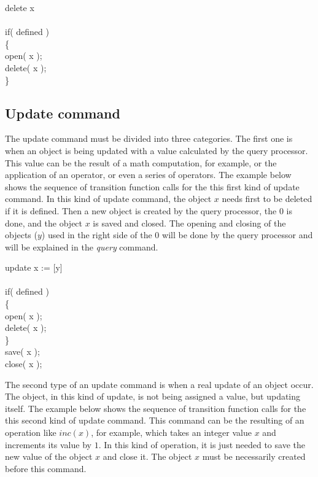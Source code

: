 \documentclass [11pt, a4paper] {article}
\begin{document}
\begin{table}[h]
\begin{pseudocode}
delete x \\
\\
if( defined ) \\
\{ \\
\> open( x ); \\
\> delete( x ); \\
\}
\end{pseudocode}
\end{table}

\subsection{Update command}

The update command must be divided into three categories. The first one is when an object is being updated with a value calculated by the query processor. This value can be the result of a math computation, for example, or the application of an operator, or even a series of operators. The example below shows the sequence of transition function calls for the this first kind of update command. In this kind of update command, the object $x$ needs first to be deleted if it is defined. Then a new object is created by the query processor, the 0 is done, and the object $x$ is saved and closed. The opening and closing of the objects ($y$) used in the right side of the 0 will be done by the query processor and will be explained in the \emph{query} command.

\begin{table}[h]
\begin{pseudocode}
update x := [y] \\
\\
if( defined ) \\
\{ \\
\> open( x ); \\
\> delete( x ); \\
\} \\
save( x ); \\
close( x ); \\
\end{pseudocode}
\end{table}

The second type of an update command is when a real update of an object occur. The object, in this kind of update, is not being assigned a value, but updating itself. The example below shows the sequence of transition function calls for the this second kind of update command. This command can be the resulting of an operation like $inc(x)$, for example, which takes an integer value $x$ and increments its value by $1$. In this kind of operation, it is just needed to save the new value of the object $x$ and close it. The object $x$ must be necessarily created before this command.
\end{document}

